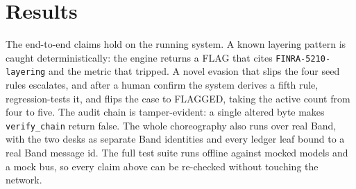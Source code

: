 \documentclass[11pt,a4paper]{article}
\begin{document}
\section{Results}
The end-to-end claims hold on the running system. A known layering pattern is caught deterministically: the engine returns a FLAG that cites \texttt{FINRA-5210-layering} and the metric that tripped. A novel evasion that slips the four seed rules escalates, and after a human confirm the system derives a fifth rule, regression-tests it, and flips the case to FLAGGED, taking the active count from four to five. The audit chain is tamper-evident: a single altered byte makes \texttt{verify\_chain} return false. The whole choreography also runs over real Band, with the two desks as separate Band identities and every ledger leaf bound to a real Band message id. The full test suite runs offline against mocked models and a mock bus, so every claim above can be re-checked without touching the network.
\end{document}
